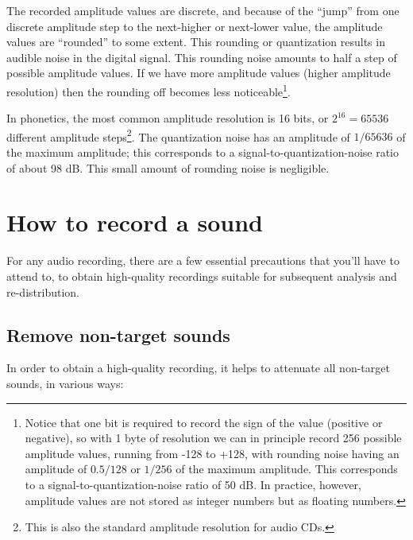 \documentclass[
]{book}
\begin{document}
The recorded amplitude values are discrete, and because of the ``jump'' from one discrete amplitude step to the next-higher or next-lower value, the amplitude values are ``rounded'' to some extent. This rounding or quantization results in audible noise in the digital signal. This rounding noise amounts to half a step of possible amplitude values. If we have more amplitude values (higher amplitude resolution) then the rounding off becomes less noticeable\footnote{Notice that one bit is required to record the sign of the value (positive or negative), so with 1 byte of resolution we can in principle record 256 possible amplitude values, running from -128 to +128, with rounding noise having an amplitude of \(0.5/128\) or \(1/256\) of the maximum amplitude. This corresponds to a signal-to-quantization-noise ratio of 50 dB. In practice, however, amplitude values are not stored as integer numbers but as floating numbers.}.

In phonetics, the most common amplitude resolution is 16 bits, or \(2^{16} = 65536\) different amplitude steps\footnote{This is also the standard amplitude resolution for audio CDs.}. The quantization noise has an amplitude of \(1/65636\) of the maximum amplitude; this corresponds to a signal-to-quantization-noise ratio of about 98 dB. This small amount of rounding noise is negligible.

\section{How to record a sound}\label{how-to-record-a-sound}

For any audio recording, there are a few essential precautions that you'll have to attend to, to obtain high-quality recordings suitable for subsequent analysis and re-distribution.

\label{recording}
\subsection{Remove non-target sounds}\label{remove-non-target-sounds}

In order to obtain a high-quality recording, it helps to attenuate all non-target sounds, in various ways:
\end{document}
